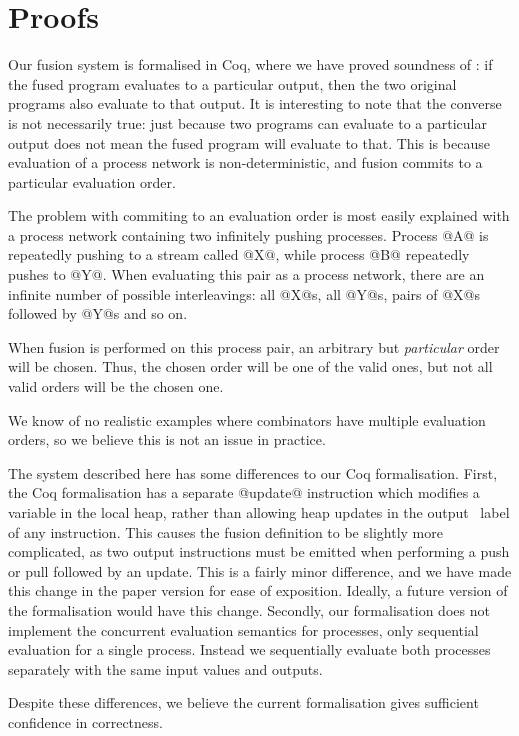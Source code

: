 
\section{Proofs}
\label{s:Proofs}

Our fusion system is formalised in Coq, where we have proved soundness of : if the fused program evaluates to a particular output, then the two original programs also evaluate to that output.
It is interesting to note that the converse is not necessarily true: just because two programs can evaluate to a particular output does not mean the fused program will evaluate to that.
This is because evaluation of a process network is non-deterministic, and fusion commits to a particular evaluation order.

The problem with commiting to an evaluation order is most easily explained with a process network containing two infinitely pushing processes.
Process @A@ is repeatedly pushing to a stream called @X@, while process @B@ repeatedly pushes to @Y@.
When evaluating this pair as a process network, there are an infinite number of possible interleavings: all @X@s, all @Y@s, pairs of @X@s followed by @Y@s and so on.

When fusion is performed on this process pair, an arbitrary but \emph{particular} order will be chosen.
Thus, the chosen order will be one of the valid ones, but not all valid orders will be the chosen one.

We know of no realistic examples where combinators have multiple evaluation orders, so we believe this is not an issue in practice.

The system described here has some differences to our Coq formalisation.
First, the Coq formalisation has a separate @update@ instruction which modifies a variable in the local heap, rather than allowing heap updates in the output \Next~label of any instruction.
This causes the fusion definition to be slightly more complicated, as two output instructions must be emitted when performing a push or pull followed by an update.
This is a fairly minor difference, and we have made this change in the paper version for ease of exposition.
Ideally, a future version of the formalisation would have this change.
Secondly, our formalisation does not implement the concurrent evaluation semantics for processes, only sequential evaluation for a single process.
Instead we sequentially evaluate both processes separately with the same input values and outputs.

Despite these differences, we believe the current formalisation gives sufficient confidence in correctness.

